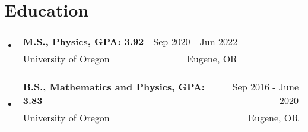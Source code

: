 \documentclass[letterpaper,10.8pt]{article}
\makeatletter
\newcommand{\resumeSubheading}[4]{
  \vspace{-1pt} \item
    \begin{tabular*}{0.97\textwidth}{l@{\extracolsep{\fill}}r}
      \textbf{#1} & #2 \\
      #3  &  #4 \\
    \end{tabular*}\vspace{-5pt}
}
\newcommand{\resumeSubHeadingListStart}{\begin{itemize}[leftmargin=*]}
\newcommand{\resumeSubHeadingListEnd}{\end{itemize}}
\makeatother
\begin{document}
\section{Education}
  \resumeSubHeadingListStart
    \resumeSubheading
      {M.S., Physics, GPA: 3.92}{Sep 2020 - Jun 2022}
      {University of Oregon}{Eugene, OR}
      
	   
    \resumeSubheading
      {B.S., Mathematics and Physics, GPA: 3.83 }{Sep 2016 - June 2020}
      {University of Oregon}{Eugene, OR}
  \resumeSubHeadingListEnd





\end{document}
